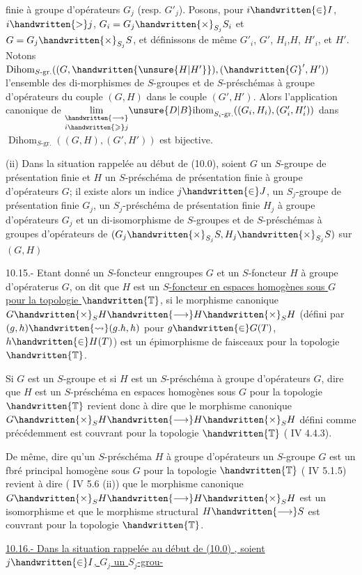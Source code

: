 finie à groupe d'opérateurs $G_j$ (resp. $G'_j$). Posons, pour $i\handwritten{\in}I$, $i\handwritten{>}j$, $G_i=G_j\handwritten{\times}_{S_j}S_i$ et $G=G_j\handwritten{\times}_{S_j}S$, et définissons de même $G'_i$, $G'$, $H_i$,$H$, $H'_i$, et $H'$. Notons $\operatorname{Dihom}_{S\text{-gr.}}((G,\handwritten{\unsure{H|H'}}),(\handwritten{G}',H'))$ l'ensemble des di-morphismes de $S$-groupes et de $S$-préschémas à groupe d'opérateurs du couple $(G,H)$ dans le couple $(G',H')$. Alors l'application canonique de $\underset{i\handwritten{\geqslant}j}{\underset{\handwritten{\longrightarrow}}{\lim}}{\unsure{D|B}\mathrm{ihom}}_{S_i\text{-gr.}}((G_i,H_i),(G'_i,H'_i))$ dans $\operatorname{Dihom}_{S\text{-gr.}}((G,H),(G',H'))$ est bijective.

(ii) Dans la situation rappelée au début de (10.0), soient $G$ un $S$-groupe  de présentation finie et $H$ un $S$-préschéma de présentation finie à groupe d'opérateurs $G$; il existe alors un indice $j\handwritten{\in}J$, un $S_j$-groupe de présentation finie $G_j$, un $S_j$-préschéma de présentation finie $H_j$ à groupe d'opérateurs $G_j$ et un di-isomorphisme de $S$-groupes et de $S$-préschémas à groupes d'opérateurs de $(G_j\handwritten{\times}_{S_j}S,H_j\handwritten{\times}_{S_j}S)$ sur$(G,H)$

 10.15.- Etant donné un $S$-foncteur enngroupes $G$ et un $S$-foncteur $H$ à groupe d'opératerus $G$, on dit que $H$ est un \uline{$S$-foncteur en espaces homogènes sous $G$ pour la topologie $\handwritten{\mathbb{T}}$}, si le morphisme canonique $G\handwritten{\times}_S H\handwritten{\longrightarrow}H\handwritten{\times}_S H$ (défini par $(g,h)\handwritten{\rightsquigarrow}(g.h,h)$ pour $g\handwritten{\in}G(T)$, $h\handwritten{\in}H(T)$) est un épimorphisme de faisceaux pour la topologie $\handwritten{\mathbb{T}}$.

Si $G$ est un $S$-groupe et si $H$ est un $S$-préschéma à  groupe d'opérateurs $G$, dire que $H$ est un $S$-préschéma en espaces homogènes sous $G$ pour la topologie $\handwritten{\mathbb{T}}$ revient donc à dire que le morphisme canonique $G\handwritten{\times}_S H\handwritten{\longrightarrow}H\handwritten{\times}_S H$ défini comme précédemment est couvrant pour la topologie $\handwritten{\mathbb{T}}$ ( IV 4.4.3).

De même, dire qu'un $S$-préschéma $H$ à groupe d'opérateurs un $S$-groupe $G$ est un fbré principal homogène sous $G$ pour la topologie $\handwritten{\mathbb{T}}$ ( IV 5.1.5) revient à dire ( IV 5.6 (ii)) que le morphisme canonique $G\handwritten{\times}_S H\handwritten{\longrightarrow}H\handwritten{\times}_S H$ est un isomorphisme et que le morphisme structural $H\handwritten{\longrightarrow}S$ est couvrant pour la topologie $\handwritten{\mathbb{T}}$.

\uline{10.16.- Dans la situation rappelée au début de (10.0) , soient $j\handwritten{\in}I$, $G_j$ un $S_j$-grou-}
